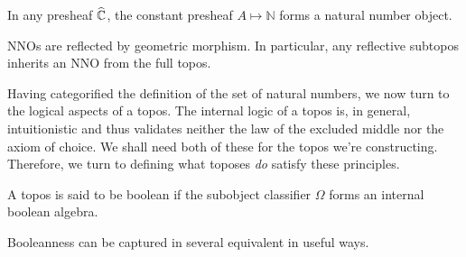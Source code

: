 \begin{example}
  In any presheaf $\widehat{\mathbb{C}}$, the constant presheaf $A \mapsto
  \mathbb{N}$ forms a natural number object.
\end{example}

\begin{example}
  NNOs are reflected by geometric morphism. In particular, any
  reflective subtopos inherits an NNO from the full topos.
\end{example}

Having categorified the definition of the set of natural numbers, we
now turn to the logical aspects of a topos. The internal logic of a
topos is, in general, intuitionistic and thus validates neither the
law of the excluded middle nor the axiom of choice. We shall need both
of these for the topos we're constructing. Therefore, we turn to
defining what toposes \emph{do} satisfy these principles.

\begin{defn}\label{defn:background:boolean}
  A topos is said to be boolean if the subobject classifier $\Omega$
  forms an internal boolean algebra.
\end{defn}

Booleanness can be captured in several equivalent in useful ways.


